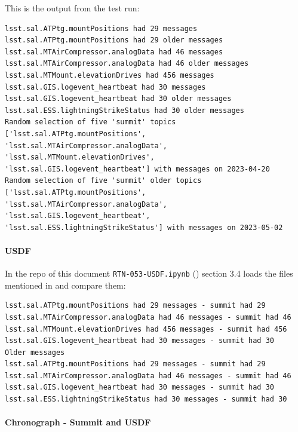 This is the output from the test run:

\begin{lstlisting}
lsst.sal.ATPtg.mountPositions had 29 messages
lsst.sal.ATPtg.mountPositions had 29 older messages
lsst.sal.MTAirCompressor.analogData had 46 messages
lsst.sal.MTAirCompressor.analogData had 46 older messages
lsst.sal.MTMount.elevationDrives had 456 messages
lsst.sal.GIS.logevent_heartbeat had 30 messages
lsst.sal.GIS.logevent_heartbeat had 30 older messages
lsst.sal.ESS.lightningStrikeStatus had 30 older messages
Random selection of five 'summit' topics ['lsst.sal.ATPtg.mountPositions',
'lsst.sal.MTAirCompressor.analogData', 'lsst.sal.MTMount.elevationDrives',
'lsst.sal.GIS.logevent_heartbeat'] with messages on 2023-04-20
Random selection of five 'summit' older topics ['lsst.sal.ATPtg.mountPositions',
'lsst.sal.MTAirCompressor.analogData', 'lsst.sal.GIS.logevent_heartbeat',
'lsst.sal.ESS.lightningStrikeStatus'] with messages on 2023-05-02
\end{lstlisting}

\paragraph{USDF}
In the repo of this document \texttt{RTN-053-USDF.ipynb} ()  section 3.4
loads the files mentioned in  and compare them:

\begin{lstlisting}
lsst.sal.ATPtg.mountPositions had 29 messages - summit had 29
lsst.sal.MTAirCompressor.analogData had 46 messages - summit had 46
lsst.sal.MTMount.elevationDrives had 456 messages - summit had 456
lsst.sal.GIS.logevent_heartbeat had 30 messages - summit had 30
Older messages
lsst.sal.ATPtg.mountPositions had 29 messages - summit had 29
lsst.sal.MTAirCompressor.analogData had 46 messages - summit had 46
lsst.sal.GIS.logevent_heartbeat had 30 messages - summit had 30
lsst.sal.ESS.lightningStrikeStatus had 30 messages - summit had 30
\end{lstlisting}

\paragraph{Chronograph - Summit and USDF} \label{sec:chrono}

